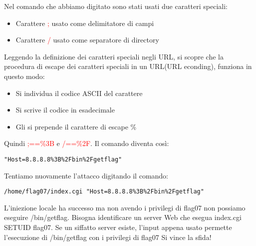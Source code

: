 Nel comando che abbiamo digitato sono stati usati due caratteri speciali:
\begin{itemize}
    \item Carattere \textcolor{red}{;} usato come delimitatore di campi
    \item Carattere \textcolor{red}{/} usato come separatore di directory
\end{itemize}
Leggendo la definizione dei caratteri speciali negli URL, si scopre che la procedura di escape dei caratteri speciali in un URL(URL econding), funziona in questo modo:
\begin{itemize}
    \item Si individua il codice ASCII del carattere
    \item Si scrive il codice in esadecimale
    \item Gli si prepende il carattere di escape \%
\end{itemize}
Quindi \textcolor{red}{;==\%3B} e \textcolor{red}{/==\%2F}. Il comando diventa così:
\begin{lstlisting}[style=bashstyle]
    "Host=8.8.8.8%3B%2Fbin%2Fgetflag"
\end{lstlisting}
Tentiamo nuovamente l’attacco digitando il comando:
\begin{lstlisting}[style=bashstyle]
    /home/flag07/index.cgi "Host=8.8.8.8%3B%2Fbin%2Fgetflag"
\end{lstlisting}
L'iniezione locale ha successo ma non avendo i privilegi di flag07 non possiamo eseguire /bin/getflag.
Bisogna identificare un server Web che esegua index.cgi SETUID flag07. Se un siffatto server esiste, l'input appena usato permette l'esecuzione di /bin/getflag con i privilegi di flag07 
Si vince la sfida!


